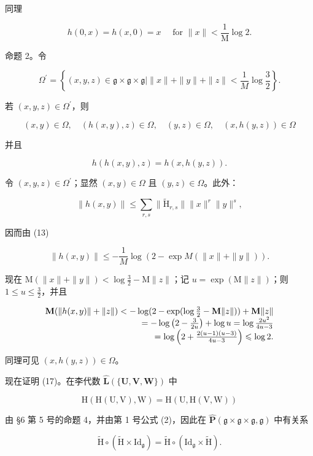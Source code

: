 同理

\[
h (0, x) = h (x, 0) = x \quad \text { for } \| x \| <   \frac {1}{\mathrm{M}} \log 2.\tag{15}
\]

命题 2。令

\[
\Omega^ {\prime} = \left\{(x, y, z) \in \mathfrak {g} \times \mathfrak {g} \times \mathfrak {g} | \| x \| + \| y \| + \| z \| <   \frac {1}{M} \log \frac {3}{2} \right\}.
\]

若 \((x,y,z)\in \Omega^{\prime}\)，则

\[
(x, y) \in \Omega , \quad (h (x, y), z) \in \Omega , \quad (y, z) \in \Omega , \quad (x, h (y, z)) \in \Omega\tag{16}
\]

并且

\[
h (h (x, y), z) = h (x, h (y, z)).\tag{17}
\]

令 \((x,y,z)\in \Omega^{\prime}\)；显然 \((x,y)\in \Omega\) 且 \((y,z)\in \Omega\)。此外：

\[
\| h (x, y) \| \leqslant \sum_ {r, s} \| \tilde {\mathrm{H}} _ {r, s} \| \| x \| ^ {r} \| y \| ^ {s},
\]

因而由 (13)

\[
\| h (x, y) \| \leqslant - \frac {1}{M} \log (2 - \exp M (\| x \| + \| y \|)).
\]

现在 \(\mathrm{M}(\|x\| + \|y\|) < \log \frac{3}{2} - \mathrm{M}\|z\|\)；记 \(u = \exp(\mathrm{M}\|z\|)\)；则 \(1 \leqslant u \leqslant \frac{3}{2}\)，并且

\[
\begin{array}{r l} \mathbf {M} (\| h (x, y) \| + \| z \|) <   - \log (2 - \exp (\log \frac {3}{2} - \mathbf {M} \| z \|)) + \mathbf {M} \| z \| \\ = - \log \left(2 - \frac {3}{2 u}\right) + \log u = \log \frac {2 u ^ {2}}{4 u - 3} \\ = \log \left(2 + \frac {2 (u - 1) (u - 3)}{4 u - 3}\right) \leqslant \log 2. \end{array}
\]

同理可见 \((x, h(y, z)) \in \Omega\)。

现在证明 (17)。在李代数 \(\hat{\mathbf{L}}(\{\mathbf{U},\mathbf{V},\mathbf{W}\})\) 中

\[
\mathrm{H} (\mathrm{H} (\mathrm{U}, \mathrm{V}), \mathrm{W}) = \mathrm{H} (\mathrm{U}, \mathrm{H} (\mathrm{V}, \mathrm{W}))
\]

由 §6 第 5 号的命题 4，并由第 1 号公式 (2)，因此在 \(\hat{\mathbf{P}}(\mathfrak{g} \times \mathfrak{g} \times \mathfrak{g}, \mathfrak{g})\) 中有关系

\[
\tilde {\mathrm{H}} \circ (\tilde {\mathrm{H}} \times \mathrm{Id} _ {\mathfrak {g}}) = \tilde {\mathrm{H}} \circ (\mathrm{Id} _ {\mathfrak {g}} \times \tilde {\mathrm{H}}).
\]


